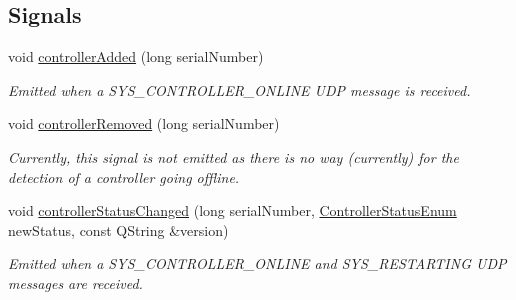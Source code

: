 \subsection*{Signals}
\begin{DoxyCompactItemize}
\item 
\mbox{\label{class_controller_manager_a38c42bcc777c296ff2e0e4c4099dbdf7}} 
void \hyperlink{class_controller_manager_a38c42bcc777c296ff2e0e4c4099dbdf7}{controller\+Added} (long serial\+Number)
\begin{DoxyCompactList}\small\item\em Emitted when a S\+Y\+S\+\_\+\+C\+O\+N\+T\+R\+O\+L\+L\+E\+R\+\_\+\+O\+N\+L\+I\+NE U\+DP message is received. \end{DoxyCompactList}\item 
\mbox{\label{class_controller_manager_aaca6003c9cc1a0c184932fd4b2649b8a}} 
void \hyperlink{class_controller_manager_aaca6003c9cc1a0c184932fd4b2649b8a}{controller\+Removed} (long serial\+Number)
\begin{DoxyCompactList}\small\item\em Currently, this signal is not emitted as there is no way (currently) for the detection of a controller going offline. \end{DoxyCompactList}\item 
\mbox{\label{class_controller_manager_a29c4328ec349955663b4d50e13e1d290}} 
void \hyperlink{class_controller_manager_a29c4328ec349955663b4d50e13e1d290}{controller\+Status\+Changed} (long serial\+Number, \hyperlink{_global_defs_8h_a51207b6a49e0da6f9978a3019d93480a}{Controller\+Status\+Enum} new\+Status, const Q\+String \&version)
\begin{DoxyCompactList}\small\item\em Emitted when a S\+Y\+S\+\_\+\+C\+O\+N\+T\+R\+O\+L\+L\+E\+R\+\_\+\+O\+N\+L\+I\+NE and S\+Y\+S\+\_\+\+R\+E\+S\+T\+A\+R\+T\+I\+NG U\+DP messages are received. \end{DoxyCompactList}\end{DoxyCompactItemize}
